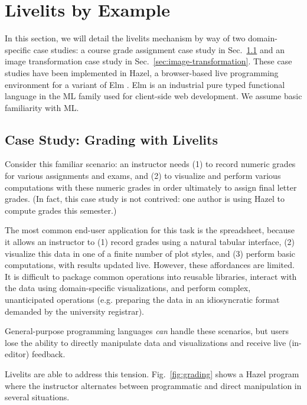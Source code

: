 \section{Livelits by Example}
\label{sec:case-studies}


In this section, we will detail the livelits mechanism by way of
two domain-specific case studies:
a course grade assignment case study in Sec.~\ref{sec:live-grading}
and an image transformation case study in Sec.~\ref{sec:image-transformation}.
These case studies have been implemented
in Hazel, a browser-based live programming environment for a 
variant of Elm \cite{Elm}.
Elm is an industrial pure typed functional language in the
ML family used for client-side web development.
We assume basic familiarity with ML.

\subsection{Case Study: Grading with Livelits}\label{sec:live-grading}
Consider this familiar scenario: an instructor needs
(1) to record numeric grades for various assignments and exams, and
(2) to visualize and perform various computations with these numeric grades
in order ultimately to assign final letter grades.
(In fact, this case study is not contrived: one author is using Hazel to compute grades this semester.)

The most common end-user application for this task is the spreadsheet, because
it allows an instructor to (1) record grades using a natural tabular interface,
(2) visualize this data in one of a finite number of plot styles,
and (3) perform basic computations,
with results updated live.
However, these affordances are limited.
It is difficult to package common operations
into reusable libraries, interact with the data using domain-specific visualizations,
and perform complex, unanticipated operations
(e.g. preparing the data in an idiosyncratic format demanded by the university registrar).

General-purpose programming languages
\emph{can} handle these scenarios, but users
lose the ability to 
directly manipulate data and visualizations
and receive live (in-editor) feedback.

Livelits are able to address this tension.
Fig.~\ref{fig:grading} shows a Hazel program where
the instructor alternates between programmatic and direct manipulation in several situations.

